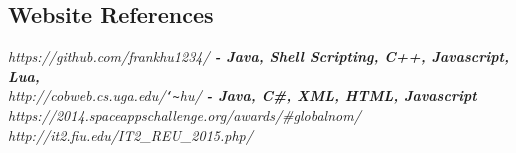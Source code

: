 \documentclass[margin,line]{resume}
\begin{document}
\begin{resume}
\section{\mysidestyle Website References} 
\textsl{https://github.com/frankhu1234/  \textbf{ - Java, Shell Scripting, C++, Javascript, Lua, \LaTeXe}}
\vspace{1mm}\\      
\textsl{http://cobweb.cs.uga.edu/\texttt{\char`\~}hu/  \textbf{ - Java, C\#, XML, HTML, Javascript}}   
\vspace{1mm}\\      
\textsl{https://2014.spaceappschallenge.org/awards/\#globalnom/}
\vspace{1mm}\\      
\textsl{http://it2.fiu.edu/IT2\_REU\_2015.php/} 






\end{resume}
\end{document}
